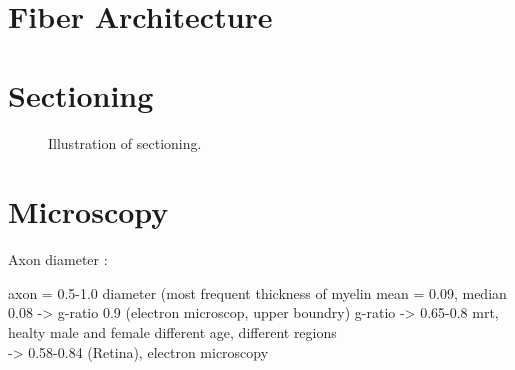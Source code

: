 \section{Fiber Architecture}
%
\section{Sectioning}
%
\begin{figure}[!tb]
	\centering
	\caption{Illustration of sectioning.}
	\label{fig::brain_sectioning}
\end{figure}
%
\section{Microscopy}
% 
Axon diameter \cite{Liewald2014}:
% 
\begin{table}
\centering
{}
\caption{axon diameter distribution of the human brain in \si{\micro\meter} \cite{Liewald2014}}
\end{table}
axon = 0.5-1.0 diameter (most frequent
thickness of myelin mean = 0.09, median 0.08
-> g-ratio 0.9 (electron microscop, upper boundry)
% 
g-ratio
\cite{Cercignani2017} -> 0.65-0.8 mrt, healty male and female different age, different regions\\
\cite{FitzGibbon2013} -> 0.58-0.84 (Retina), electron microscopy

